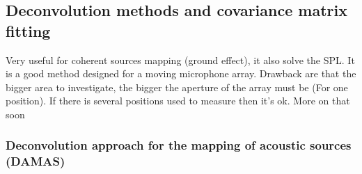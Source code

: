 \subsection{Deconvolution methods and covariance matrix fitting}

Very useful for coherent sources mapping (ground effect), it also solve the SPL. It is a good method designed for a moving microphone array. Drawback are that the bigger area to investigate, the bigger the aperture of the array must be (For one position). If there is several positions used to measure then it's ok.  More on that soon

\subsubsection{Deconvolution approach for the mapping of acoustic sources (DAMAS)}

